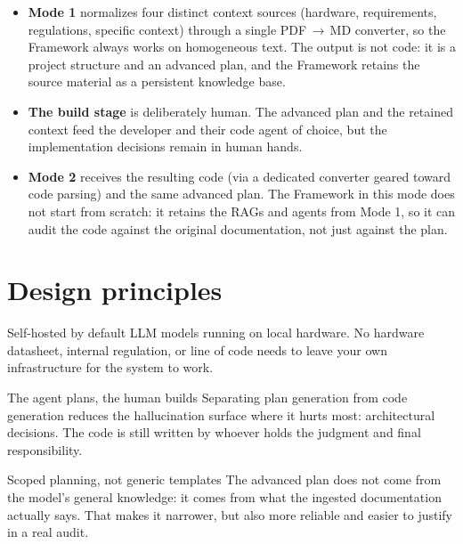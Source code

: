 \documentclass[11pt]{article}
\begin{document}
\begin{itemize}
  \item \textbf{Mode 1} normalizes four distinct context sources (hardware, requirements, regulations, specific context) through a single PDF\,\(\to\)\,MD converter, so the Framework always works on homogeneous text. The output is not code: it is a project structure and an advanced plan, and the Framework retains the source material as a persistent knowledge base.
  \item \textbf{The build stage} is deliberately human. The advanced plan and the retained context feed the developer and their code agent of choice, but the implementation decisions remain in human hands.
  \item \textbf{Mode 2} receives the resulting code (via a dedicated converter geared toward code parsing) and the same advanced plan. The Framework in this mode does not start from scratch: it retains the RAGs and agents from Mode 1, so it can audit the code against the original documentation, not just against the plan.
\end{itemize}

\section{Design principles}

\begin{ideabox}{Self-hosted by default}
LLM models running on local hardware. No hardware datasheet, internal regulation, or line of code needs to leave your own infrastructure for the system to work.
\end{ideabox}

\vspace{0.4em}

\begin{ideabox}{The agent plans, the human builds}
Separating plan generation from code generation reduces the hallucination surface where it hurts most: architectural decisions. The code is still written by whoever holds the judgment and final responsibility.
\end{ideabox}

\vspace{0.4em}

\begin{ideabox}{Scoped planning, not generic templates}
The advanced plan does not come from the model's general knowledge: it comes from what the ingested documentation actually says. That makes it narrower, but also more reliable and easier to justify in a real audit.
\end{ideabox}
\end{document}
